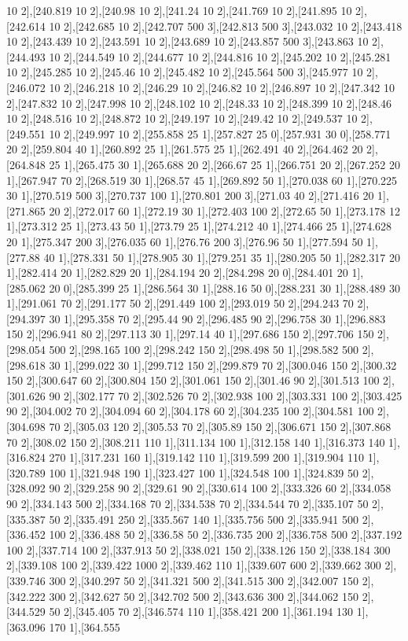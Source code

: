 {10 2],[240.819 10 2],[240.98 10 2],[241.24 10 2],[241.769 10 2],[241.895 10 2],[242.614 10 2],[242.685 10 2],[242.707 500 3],[242.813 500 3],[243.032 10 2],[243.418 10 2],[243.439 10 2],[243.591 10 2],[243.689 10 2],[243.857 500 3],[243.863 10 2],[244.493 10 2],[244.549 10 2],[244.677 10 2],[244.816 10 2],[245.202 10 2],[245.281 10 2],[245.285 10 2],[245.46 10 2],[245.482 10 2],[245.564 500 3],[245.977 10 2],[246.072 10 2],[246.218 10 2],[246.29 10 2],[246.82 10 2],[246.897 10 2],[247.342 10 2],[247.832 10 2],[247.998 10 2],[248.102 10 2],[248.33 10 2],[248.399 10 2],[248.46 10 2],[248.516 10 2],[248.872 10 2],[249.197 10 2],[249.42 10 2],[249.537 10 2],[249.551 10 2],[249.997 10 2],[255.858 25 1],[257.827 25 0],[257.931 30 0],[258.771 20 2],[259.804 40 1],[260.892 25 1],[261.575 25 1],[262.491 40 2],[264.462 20 2],[264.848 25 1],[265.475 30 1],[265.688 20 2],[266.67 25 1],[266.751 20 2],[267.252 20 1],[267.947 70 2],[268.519 30 1],[268.57 45 1],[269.892 50 1],[270.038 60 1],[270.225 30 1],[270.519 500 3],[270.737 100 1],[270.801 200 3],[271.03 40 2],[271.416 20 1],[271.865 20 2],[272.017 60 1],[272.19 30 1],[272.403 100 2],[272.65 50 1],[273.178 12 1],[273.312 25 1],[273.43 50 1],[273.79 25 1],[274.212 40 1],[274.466 25 1],[274.628 20 1],[275.347 200 3],[276.035 60 1],[276.76 200 3],[276.96 50 1],[277.594 50 1],[277.88 40 1],[278.331 50 1],[278.905 30 1],[279.251 35 1],[280.205 50 1],[282.317 20 1],[282.414 20 1],[282.829 20 1],[284.194 20 2],[284.298 20 0],[284.401 20 1],[285.062 20 0],[285.399 25 1],[286.564 30 1],[288.16 50 0],[288.231 30 1],[288.489 30 1],[291.061 70 2],[291.177 50 2],[291.449 100 2],[293.019 50 2],[294.243 70 2],[294.397 30 1],[295.358 70 2],[295.44 90 2],[296.485 90 2],[296.758 30 1],[296.883 150 2],[296.941 80 2],[297.113 30 1],[297.14 40 1],[297.686 150 2],[297.706 150 2],[298.054 500 2],[298.165 100 2],[298.242 150 2],[298.498 50 1],[298.582 500 2],[298.618 30 1],[299.022 30 1],[299.712 150 2],[299.879 70 2],[300.046 150 2],[300.32 150 2],[300.647 60 2],[300.804 150 2],[301.061 150 2],[301.46 90 2],[301.513 100 2],[301.626 90 2],[302.177 70 2],[302.526 70 2],[302.938 100 2],[303.331 100 2],[303.425 90 2],[304.002 70 2],[304.094 60 2],[304.178 60 2],[304.235 100 2],[304.581 100 2],[304.698 70 2],[305.03 120 2],[305.53 70 2],[305.89 150 2],[306.671 150 2],[307.868 70 2],[308.02 150 2],[308.211 110 1],[311.134 100 1],[312.158 140 1],[316.373 140 1],[316.824 270 1],[317.231 160 1],[319.142 110 1],[319.599 200 1],[319.904 110 1],[320.789 100 1],[321.948 190 1],[323.427 100 1],[324.548 100 1],[324.839 50 2],[328.092 90 2],[329.258 90 2],[329.61 90 2],[330.614 100 2],[333.326 60 2],[334.058 90 2],[334.143 500 2],[334.168 70 2],[334.538 70 2],[334.544 70 2],[335.107 50 2],[335.387 50 2],[335.491 250 2],[335.567 140 1],[335.756 500 2],[335.941 500 2],[336.452 100 2],[336.488 50 2],[336.58 50 2],[336.735 200 2],[336.758 500 2],[337.192 100 2],[337.714 100 2],[337.913 50 2],[338.021 150 2],[338.126 150 2],[338.184 300 2],[339.108 100 2],[339.422 1000 2],[339.462 110 1],[339.607 600 2],[339.662 300 2],[339.746 300 2],[340.297 50 2],[341.321 500 2],[341.515 300 2],[342.007 150 2],[342.222 300 2],[342.627 50 2],[342.702 500 2],[343.636 300 2],[344.062 150 2],[344.529 50 2],[345.405 70 2],[346.574 110 1],[358.421 200 1],[361.194 130 1],[363.096 170 1],[364.555 }
